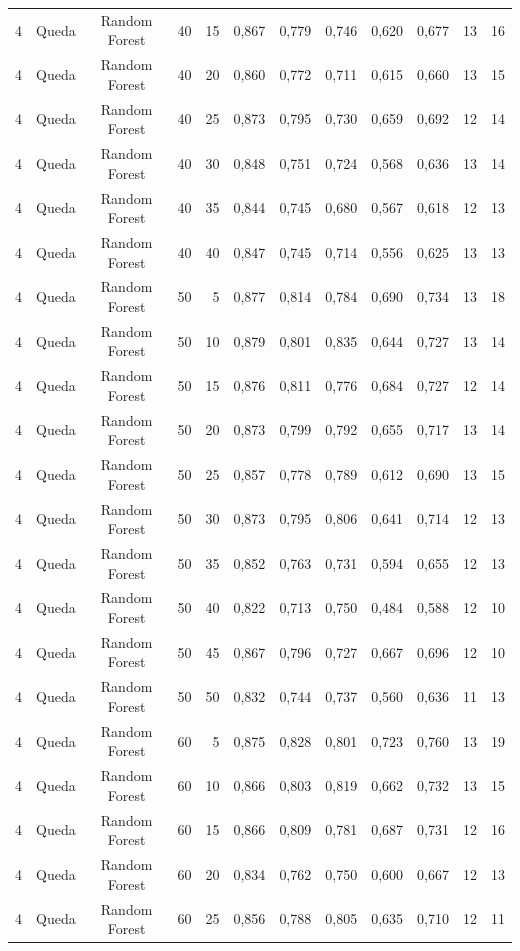 \begin{longtable}{ccclrrrrrrrr}
4 & Queda & Random Forest & 40 & 15 & 0,867 & 0,779 & 0,746 & 0,620 & 0,677 & 13 & 16 \\
4 & Queda & Random Forest & 40 & 20 & 0,860 & 0,772 & 0,711 & 0,615 & 0,660 & 13 & 15 \\
4 & Queda & Random Forest & 40 & 25 & 0,873 & 0,795 & 0,730 & 0,659 & 0,692 & 12 & 14 \\
4 & Queda & Random Forest & 40 & 30 & 0,848 & 0,751 & 0,724 & 0,568 & 0,636 & 13 & 14 \\
4 & Queda & Random Forest & 40 & 35 & 0,844 & 0,745 & 0,680 & 0,567 & 0,618 & 12 & 13 \\
4 & Queda & Random Forest & 40 & 40 & 0,847 & 0,745 & 0,714 & 0,556 & 0,625 & 13 & 13 \\
4 & Queda & Random Forest & 50 & 5 & 0,877 & 0,814 & 0,784 & 0,690 & 0,734 & 13 & 18 \\
4 & Queda & Random Forest & 50 & 10 & 0,879 & 0,801 & 0,835 & 0,644 & 0,727 & 13 & 14 \\
4 & Queda & Random Forest & 50 & 15 & 0,876 & 0,811 & 0,776 & 0,684 & 0,727 & 12 & 14 \\
4 & Queda & Random Forest & 50 & 20 & 0,873 & 0,799 & 0,792 & 0,655 & 0,717 & 13 & 14 \\
4 & Queda & Random Forest & 50 & 25 & 0,857 & 0,778 & 0,789 & 0,612 & 0,690 & 13 & 15 \\
4 & Queda & Random Forest & 50 & 30 & 0,873 & 0,795 & 0,806 & 0,641 & 0,714 & 12 & 13 \\
4 & Queda & Random Forest & 50 & 35 & 0,852 & 0,763 & 0,731 & 0,594 & 0,655 & 12 & 13 \\
4 & Queda & Random Forest & 50 & 40 & 0,822 & 0,713 & 0,750 & 0,484 & 0,588 & 12 & 10 \\
4 & Queda & Random Forest & 50 & 45 & 0,867 & 0,796 & 0,727 & 0,667 & 0,696 & 12 & 10 \\
4 & Queda & Random Forest & 50 & 50 & 0,832 & 0,744 & 0,737 & 0,560 & 0,636 & 11 & 13 \\
4 & Queda & Random Forest & 60 & 5 & 0,875 & 0,828 & 0,801 & 0,723 & 0,760 & 13 & 19 \\
4 & Queda & Random Forest & 60 & 10 & 0,866 & 0,803 & 0,819 & 0,662 & 0,732 & 13 & 15 \\
4 & Queda & Random Forest & 60 & 15 & 0,866 & 0,809 & 0,781 & 0,687 & 0,731 & 12 & 16 \\
4 & Queda & Random Forest & 60 & 20 & 0,834 & 0,762 & 0,750 & 0,600 & 0,667 & 12 & 13 \\
4 & Queda & Random Forest & 60 & 25 & 0,856 & 0,788 & 0,805 & 0,635 & 0,710 & 12 & 11 \\

\end{longtable}
